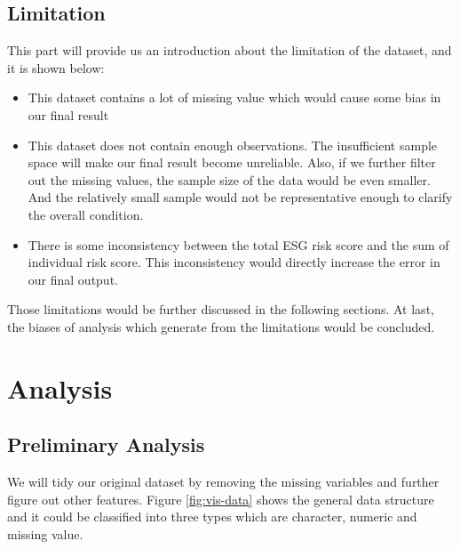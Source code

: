 \documentclass[11pt,a4paper,]{article}
\providecommand{\tightlist}{%
  \setlength{\itemsep}{0pt}\setlength{\parskip}{0pt}}
\begin{document}
\hypertarget{limitation}{%
\subsection{Limitation}\label{limitation}}

This part will provide us an introduction about the limitation of the dataset, and it is shown below:

\begin{itemize}
\tightlist
\item
  This dataset contains a lot of missing value which would cause some bias in our final result
\item
  This dataset does not contain enough observations. The insufficient sample space will make our final result become unreliable. Also, if we further filter out the missing values, the sample size of the data would be even smaller. And the relatively small sample would not be representative enough to clarify the overall condition.
\item
  There is some inconsistency between the total ESG risk score and the sum of individual risk score. This inconsistency would directly increase the error in our final output.
\end{itemize}

Those limitations would be further discussed in the following sections. At last, the biases of analysis which generate from the limitations would be concluded.

\hypertarget{analysis}{%
\section{Analysis}\label{analysis}}

\hypertarget{preliminary-analysis}{%
\subsection{Preliminary Analysis}\label{preliminary-analysis}}

We will tidy our original dataset by removing the missing variables and further figure out other features. Figure \ref{fig:vis-data} shows the general data structure and it could be classified into three types which are character, numeric and missing value.
\end{document}
